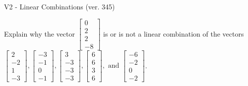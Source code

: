 \begin{exercise}
  \begin{exerciseTitle}V2 - Linear Combinations (ver. 345)\end{exerciseTitle}
  \begin{exerciseStatement}
    Explain why the vector \(\left[\begin{array}{c}
0 \\
2 \\
2 \\
-8
\end{array}\right]\)  is or is not a linear 
	combination of the vectors \(\left[\begin{array}{c}
2 \\
-2 \\
1 \\
-3
\end{array}\right] , \left[\begin{array}{c}
-3 \\
-1 \\
0 \\
-1
\end{array}\right] , \left[\begin{array}{c}
3 \\
-3 \\
-3 \\
-3
\end{array}\right] , \left[\begin{array}{c}
6 \\
6 \\
3 \\
6
\end{array}\right] , \text{ and } \left[\begin{array}{c}
-6 \\
-2 \\
0 \\
-2
\end{array}\right]\).
	



\end{exerciseStatement}
\end{exercise}

